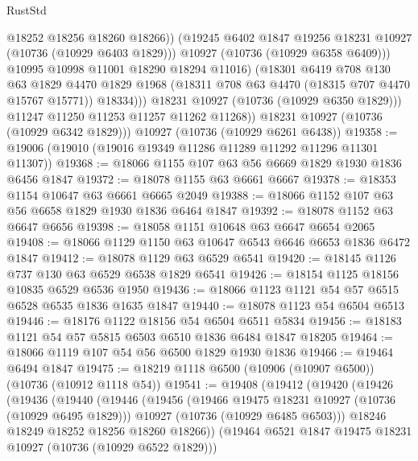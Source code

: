 \begin{lexlean}{RustStd}
\begin{coremodule}
                        @18252
                        @18256
                        @18260
                        @18266))
                    (@19245 @6402 @1847 @19256 @18231 @10927 (@10736 (@10929 @6403 @1829)))
                    @10927
                    (@10736 (@10929 @6358 @6409)))
                  @10995
                  @10998
                  @11001
                  @18290
                  @18294
                  @11016)
                (@18301
                  @6419
                  @708
                  @130
                  @63
                  @1829
                  @4470
                  @1829
                  @1968
                  (@18311 @708 @63 @4470 (@18315 @707 @4470 @15767 @15771))
                  @18334)))
            @18231
            @10927
            (@10736 (@10929 @6350 @1829)))
          @11247
          @11250
          @11253
          @11257
          @11262
          @11268))
      @18231
      @10927
      (@10736 (@10929 @6342 @1829)))
    @10927
    (@10736 (@10929 @6261 @6438))
@19358 := @19006 (@19010 (@19016 @19349 @11286 @11289 @11292 @11296 @11301 @11307))
@19368 := @18066 @1155 @107 @63 @56 @6669 @1829 @1930 @1836 @6456 @1847
@19372 := @18078 @1155 @63 @6661 @6667
@19378 := @18353 @1154 @10647 @63 @6661 @6665 @2049
@19388 := @18066 @1152 @107 @63 @56 @6658 @1829 @1930 @1836 @6464 @1847
@19392 := @18078 @1152 @63 @6647 @6656
@19398 := @18058 @1151 @10648 @63 @6647 @6654 @2065
@19408 := @18066 @1129 @1150 @63 @10647 @6543 @6646 @6653 @1836 @6472 @1847
@19412 := @18078 @1129 @63 @6529 @6541
@19420 := @18145 @1126 @737 @130 @63 @6529 @6538 @1829 @6541
@19426 := @18154 @1125 @18156 @10835 @6529 @6536 @1950
@19436 := @18066 @1123 @1121 @54 @57 @6515 @6528 @6535 @1836 @1635 @1847
@19440 := @18078 @1123 @54 @6504 @6513
@19446 := @18176 @1122 @18156 @54 @6504 @6511 @5834
@19456 := @18183 @1121 @54 @57 @5815 @6503 @6510 @1836 @6484 @1847 @18205
@19464 := @18066 @1119 @107 @54 @56 @6500 @1829 @1930 @1836
@19466 := @19464 @6494 @1847
@19475 := @18219 @1118 @6500 (@10906 (@10907 @6500)) (@10736 (@10912 @1118 @54))
@19541 := @19408
    (@19412
      (@19420
        (@19426
          (@19436
            (@19440
              (@19446
                (@19456
                  (@19466 @19475 @18231 @10927 (@10736 (@10929 @6495 @1829)))
                  @10927
                  (@10736 (@10929 @6485 @6503)))
                @18246
                @18249
                @18252
                @18256
                @18260
                @18266))
            (@19464 @6521 @1847 @19475 @18231 @10927 (@10736 (@10929 @6522 @1829)))

\end{coremodule}
\end{lexlean}
